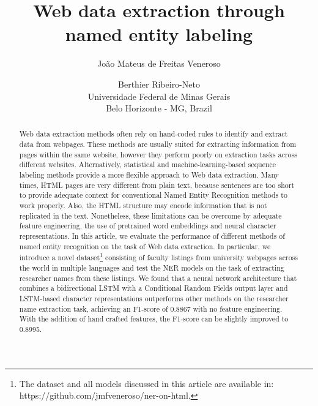 \documentclass{nle}
\begin{document}
\title{Web data extraction through named entity labeling}

\author[João Mateus de Freitas Veneroso and Berthier Ribeiro-Neto]
       {João Mateus de Freitas Veneroso \and
        Berthier Ribeiro-Neto\\
	Universidade Federal de Minas Gerais\\
	Belo Horizonte - MG, Brazil}

% 

\begin{abstract}

Web data extraction methods often rely on hand-coded rules to 
identify and extract data from webpages. These methods are usually
suited for extracting information from pages within
the same website, however they perform poorly on extraction 
tasks across different websites. Alternatively, statistical and 
machine-learning-based sequence labeling methods provide a more flexible 
approach to Web data extraction. Many times, HTML pages are very different 
from plain text, because sentences are too short to provide adequate 
context for conventional Named Entity Recognition methods to work 
properly. Also, the HTML structure may encode information that is not 
replicated in the text. Nonetheless, these limitations can be overcome by
adequate feature engineering, the use of pretrained word 
embeddings and neural character representations. In this article, we 
evaluate the performance of different methods of named entity recognition 
on the task of Web data extraction. In particular, we introduce a novel 
dataset\footnote{The dataset and all models discussed in this article are 
available in: https://github.com/jmfveneroso/ner-on-html.} 
consisting of faculty listings from university webpages across
the world in multiple languages and test the NER models on the task of 
extracting researcher names from these listings. We found that a 
neural network architecture that combines a bidirectional LSTM with
a Conditional Random Fields output layer and LSTM-based character 
representations outperforms other methods on the researcher name 
extraction task, achieving an F1-score of 0.8867 with no feature engineering. 
With the addition of hand crafted features, the F1-score can be slightly 
improved to 0.8995.

\end{abstract}
\end{document}
